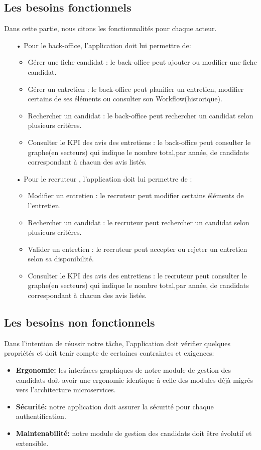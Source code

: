 \subsection{Les besoins fonctionnels}
Dans cette partie, nous citons les fonctionnalités pour chaque acteur.
\begin{itemize}
    \item [•]Pour le back-office, l'application doit lui permettre de:   
 \begin{itemize}
     \item Gérer une fiche candidat : le back-office peut ajouter ou modifier une fiche candidat.
     \item Gérer un entretien : le back-office peut planifier un entretien, modifier certains de ses éléments ou consulter son Workflow(historique).
     \item Rechercher un candidat : le back-office peut rechercher un candidat selon plusieurs critères. 
     \item Consulter le KPI des avis des entretiens : le back-office peut consulter le graphe(en secteurs) qui indique le nombre total,par année, de candidats correspondant à chacun des avis listés.
 \end{itemize}
    \item [•] Pour le recruteur , l'application doit lui permettre de : 
 \begin{itemize}
     \item Modifier un entretien : le recruteur peut modifier certains éléments de l'entretien.
     \item Rechercher un candidat : le recruteur peut rechercher un candidat selon plusieurs critères.
     \item Valider un entretien : le recruteur peut accepter ou rejeter un entretien selon sa disponibilité.
     \item Consulter le KPI des avis des entretiens : le recruteur peut consulter le graphe(en secteurs) qui indique le nombre total,par année, de candidats correspondant à chacun des avis listés.
 \end{itemize}
\end{itemize}


 \subsection{Les besoins non fonctionnels}
Dans l’intention de réussir notre tâche, l’application doit vérifier quelques propriétés et doit tenir compte de certaines contraintes et exigences:
 \begin{itemize}
     \item  \textbf{Ergonomie:} les interfaces graphiques de notre module de gestion des candidats doit avoir une ergonomie identique à celle des modules déjà migrés vers l'architecture microservices.
     \item \textbf{Sécurité:} notre application doit assurer la sécurité pour chaque authentification.
    \item \textbf{Maintenabilité:} notre module de gestion des candidats doit être évolutif et extensible.
 \end{itemize}
